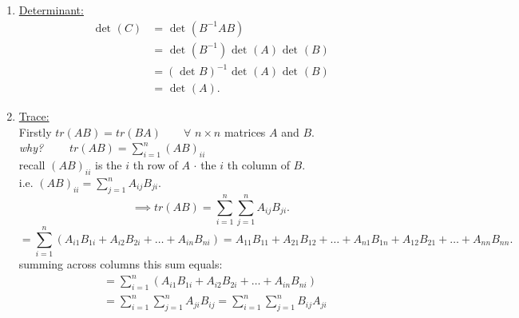 \documentclass{report}
\begin{document}
{\begin{enumerate}[label=(\arabic*).]
        Since $ A$ and $ C$ are both  $n \times n$  matrices and 
        \[
        null A + rk A = null C + rk C = n
        .\] 
        and, as proven above $ null A = null C$ \\
        $ \implies rk A = rk C$ \\
        \item \underline{Determinant:} \\
         \begin{align*}
          \text{ det }  \left( C \right) &= \text{ det } \left( B^{-1} A B \right)\\
          &= \text{ det } \left( B^{-1} \right) \text{ det } \left( A \right) \text{ det } \left( B \right)\\
          &= \left( \text{ det } B \right) ^{-1} \text{ det } \left( A \right) \text{ det } \left( B \right)\\
          &= \text{ det } \left( A \right) 
         .\end{align*}
         \item \underline{Trace:} \\
          Firstly $ tr \left( AB \right) = tr \left( BA \right) \qquad  \forall $ $n \times n$ matrices $ A$ and $ B$.\\
           \textit{why?}   $ \qquad  tr \left( AB \right) = \sum\limits_{i=1}^{n} \left( AB \right) _{i i}$ \\
           recall $ \left( AB \right) _{i i}$ is the $ i$ th row of $ A$ $ \cdot $ the $ i$ th column of $ B$.\\
           i.e. $ \left( AB \right) _{ i i }= \sum\limits_{j=1}^{n} A_{ i j } B_{ j i}$.\\
           \[
           \implies tr \left( AB \right) = \sum\limits_{i=1}^{n} \sum\limits_{j=1}^{n} A_{ i j } B_{ j i} 
           .\] 
           \[
            = \sum\limits_{i=1}^{n} \left( A_{i 1} B_{ 1 i}+ A_{ i 2} B _{ 2 i} + \ldots +A_{i n }B_{n i} \right) = A_{ 1 1} B_{ 1 1} + A_{ 2 1} B_{ 1 2} + \ldots + A_{ n 1} B_{ 1 n} + A_{ 1 2} B_{ 2 1} + \ldots + A_{ n n} B_{ n n}
           .\]
           summing across columns this sum equals:\\
           \begin{align*}
            &= \sum\limits_{i=1}^{n} \left( A_{ i 1} B_{ 1 i} + A_{ i 2} B_{ 2 i} + \ldots + A_{ i n} B_{ n i} \right)\\
            &= \sum\limits_{i=1}^{n} \sum\limits_{j=1}^{n} A_{ j i} B_{ i j} = \sum\limits_{i=1}^{n} \sum\limits_{j=1}^{n} B_{ i j} A_{ j i} \\

\end{align*}
\end{enumerate}}
\end{document}
